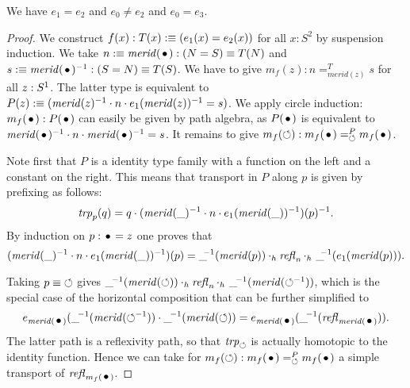 \documentclass[english,a4]{article}
\newcommand{\Sp}{{S^2}}%
\newcommand{\mrd}{\mathit{merid}}%
\begin{document}
\begin{lemma} We have $e_1 = e_2$ and $e_0 \neq e_2$ and $e_0 = e_3$.
\end{lemma}

\begin{proof}
We construct $f(x):T(x)\mathrel{\hbox{:}\mkern-5mu\equiv}(e_1(x)=e_2(x))$ for all $x:\Sp$ by 
suspension induction. We take $n\defeq\mrd(\base):(N=S)\jdeq T(N)$ and 
$s\defeq\mrd(\base)^{-1}:(S=N)\jdeq T(S)$. 
We have to give $m_f(z): n=^T_{\mrd(z)}s$
for all $z:{S^1}$. The latter type is equivalent to
$P(z)\defeq(\mrd(z)^{-1}\cdot n\cdot e_1(\mrd(z))^{-1} = s)$.
We apply circle induction:
$m_f(\base): P(\base)$ can easily be given by path algebra,
as $P(\base)$ is equivalent to 
$\mrd(\base)^{-1}\cdot n\cdot\mrd(\base)^{-1} = s$.
It remains to give $m_f(\Sloop): m_f(\base)=^P_{\Sloop}m_f(\base)$.

Note first that $P$ is a identity type family with a function on the left
and a constant on the right. This means that transport in $P$ along $p$
is given by prefixing as follows:
\[
\trp{p}(q) = q \cdot (\mrd(\_)^{-1}\cdot n \cdot e_1(\mrd(\_))^{-1})(p)^{-1}.
\]
By induction on $p:\base=z$ one proves that
\[
(\mrd(\_)^{-1}\cdot n \cdot e_1(\mrd(\_))^{-1})(p) = 
\_\!\!^{-1}(\mrd(p)) \cdot_h \refl{n} \cdot_h\  \_\!\!^{-1}(e_1(\mrd(p))).
\]
\begin{center}
\end{center}

Taking $p\equiv{\mathord{\circlearrowleft}}$ gives
$\_\!^{-1}(\mrd(\Sloop)) \cdot_h \refl{n} \cdot_h\  \_\!^{-1}(\mrd(\Sloop^{-1}))$,
which is the special case of the horizontal composition that can be further
simplified to
\begin{align}
  \label{eq:trp-for-e1=e2}
e_{\mrd(\base)}(\_\!^{-1}(\mrd(\Sloop^{-1})) \cdot\_\!^{-1}(\mrd(\Sloop)) = 
e_{\mrd(\base)}(\_\!^{-1}(\refl{\mrd(\base)})).
\end{align}
The latter path is a reflexivity path, so that $\mathop{\mathit{trp}^{}_{\mathord{\circlearrowleft}}}$ is actually homotopic 
to the identity function. Hence we can take for 
$m_f(\Sloop): m_f(\base)=^P_{\Sloop}m_f(\base)$ a simple transport of $\refl{m_f(\base)}$.


\end{proof}
\end{document}
